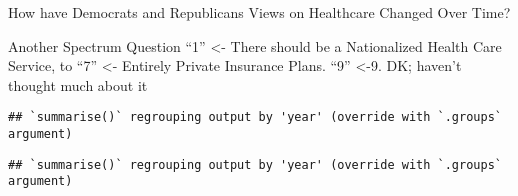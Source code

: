 \documentclass[
]{article}
\newenvironment{Shaded}{\begin{snugshade}}{\end{snugshade}}
\newcommand{\DataTypeTok}[1]{\textcolor[rgb]{0.13,0.29,0.53}{#1}}
\newcommand{\KeywordTok}[1]{\textcolor[rgb]{0.13,0.29,0.53}{\textbf{#1}}}
\newcommand{\NormalTok}[1]{#1}
\newcommand{\OperatorTok}[1]{\textcolor[rgb]{0.81,0.36,0.00}{\textbf{#1}}}
\newcommand{\StringTok}[1]{\textcolor[rgb]{0.31,0.60,0.02}{#1}}
\begin{document}
How have Democrats and Republicans Views on Healthcare Changed Over
Time?

Another Spectrum Question ``1'' \textless- There should be a
Nationalized Health Care Service, to ``7'' \textless- Entirely Private
Insurance Plans. ``9'' \textless-9. DK; haven't thought much about it

\begin{Shaded}
\end{Shaded}

\begin{verbatim}
## `summarise()` regrouping output by 'year' (override with `.groups` argument)
\end{verbatim}

\begin{Shaded}
\end{Shaded}

\begin{verbatim}
## `summarise()` regrouping output by 'year' (override with `.groups` argument)
\end{verbatim}
\end{document}
